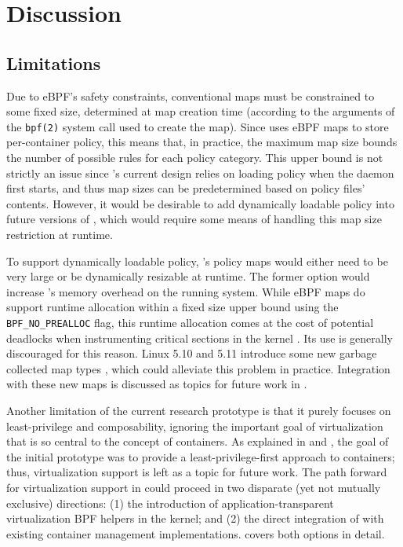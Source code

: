 \section{Discussion}


\subsection{Limitations}

Due to eBPF's safety constraints, conventional maps must be constrained to some fixed size, determined at map creation time (according to the arguments of the \texttt{bpf(2)} system call used to create the map). Since \bpfcontain{} uses eBPF maps to store per-container policy, this means that, in practice, the maximum map size bounds the number of possible rules for each policy category. This upper bound is not strictly an issue since \bpfcontain{}'s current design relies on loading policy when the daemon first starts, and thus map sizes can be predetermined based on policy files' contents. However, it would be desirable to add dynamically loadable policy into future versions of \bpfcontain{}, which would require some means of handling this map size restriction at runtime.

To support dynamically loadable policy, \bpfcontain{}'s policy maps would either need to be very large or be dynamically resizable at runtime. The former option would increase \bpfcontain{}'s memory overhead on the running system. While eBPF maps do support runtime allocation within a fixed size upper bound using the \texttt{BPF\_NO\_PREALLOC} flag, this runtime allocation comes at the cost of potential deadlocks when instrumenting critical sections in the kernel \cite{starovoitov2016_prealloc}. Its use is generally discouraged for this reason. Linux 5.10 and 5.11 introduce some new garbage collected map types \cite{singh2020_task_local_storage, singh2020_inode_local_storage}, which could alleviate this problem in practice. Integration with these new maps is discussed as topics for future work in .

Another limitation of the current research prototype is that it purely focuses on least-privilege and composability, ignoring the important goal of virtualization that is so central to the concept of containers. As explained in  and , the goal of the initial \bpfcontain{} prototype was to provide a least-privilege-first approach to containers; thus, virtualization support is left as a topic for future work. The path forward for virtualization support in \bpfcontain{} could proceed in two disparate (yet not mutually exclusive) directions: (1) the introduction of application-transparent virtualization BPF helpers in the kernel; and (2) the direct integration of \bpfcontain{} with existing container management implementations.  covers both options in detail.

